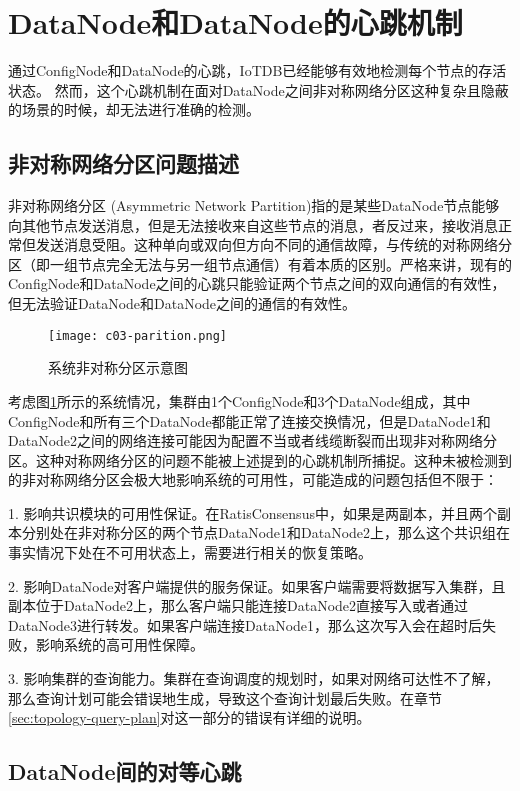 \section{DataNode和DataNode的心跳机制}


通过ConfigNode和DataNode的心跳，IoTDB已经能够有效地检测每个节点的存活状态。
然而，这个心跳机制在面对DataNode之间非对称网络分区这种复杂且隐蔽的场景的时候，却无法进行准确的检测。

\subsection{非对称网络分区问题描述}
非对称网络分区 (Asymmetric Network Partition)指的是某些DataNode节点能够向其他节点发送消息，但是无法接收来自这些节点的消息，者反过来，接收消息正常但发送消息受阻。这种单向或双向但方向不同的通信故障，与传统的对称网络分区（即一组节点完全无法与另一组节点通信）有着本质的区别。严格来讲，现有的ConfigNode和DataNode之间的心跳只能验证两个节点之间的双向通信的有效性，但无法验证DataNode和DataNode之间的通信的有效性。

\begin{figure}
  \centering
  \texttt{[image: c03-parition.png]}
  \caption{系统非对称分区示意图}
  \label{fig:c03-partition}
\end{figure}

考虑图\ref{fig:c03-partition}所示的系统情况，集群由1个ConfigNode和3个DataNode组成，其中ConfigNode和所有三个DataNode都能正常了连接交换情况，但是DataNode1和DataNode2之间的网络连接可能因为配置不当或者线缆断裂而出现非对称网络分区。这种对称网络分区的问题不能被上述提到的心跳机制所捕捉。这种未被检测到的非对称网络分区会极大地影响系统的可用性，可能造成的问题包括但不限于：

1. 影响共识模块的可用性保证。在RatisConsensus中，如果是两副本，并且两个副本分别处在非对称分区的两个节点DataNode1和DataNode2上，那么这个共识组在事实情况下处在不可用状态上，需要进行相关的恢复策略。

2. 影响DataNode对客户端提供的服务保证。如果客户端需要将数据写入集群，且副本位于DataNode2上，那么客户端只能连接DataNode2直接写入或者通过DataNode3进行转发。如果客户端连接DataNode1，那么这次写入会在超时后失败，影响系统的高可用性保障。

3. 影响集群的查询能力。集群在查询调度的规划时，如果对网络可达性不了解，那么查询计划可能会错误地生成，导致这个查询计划最后失败。在章节\ref{sec:topology-query-plan}对这一部分的错误有详细的说明。

\subsection{DataNode间的对等心跳}\label{sec:datanode-intra-heartbeat}

